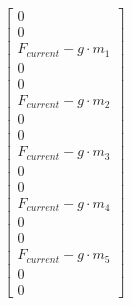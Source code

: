 $$\left[\begin{matrix}0\\0\\F_{current} - g \cdot m_{1}\\0\\0\\F_{current} - g \cdot m_{2}\\0\\0\\F_{current} - g \cdot m_{3}\\0\\0\\F_{current} - g \cdot m_{4}\\0\\0\\F_{current} - g \cdot m_{5}\\0\\0\end{matrix}\right]$$


